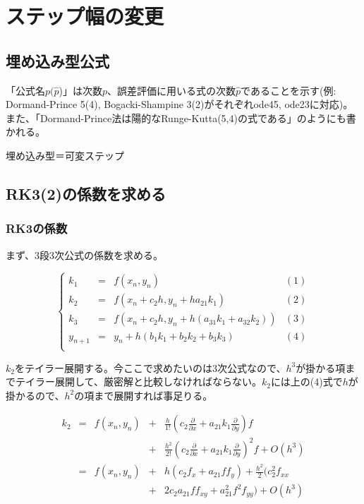 \section{ステップ幅の変更}
\subsection{埋め込み型公式}
「公式名\(p(\hat{p}\))」は次数\(p\)、誤差評価に用いる式の次数\(\hat{p}\)であることを示す(例: Dormand-Prince 5(4), Bogacki-Shampine 3(2)がそれぞれode45, ode23に対応)。
また、「Dormand-Prince法は陽的なRunge-Kutta(5,4)の式である」のようにも書かれる。

埋め込み型＝可変ステップ

\subsection{RK3(2)の係数を求める}
\subsubsection{RK3の係数}
まず、3段3次公式の係数を求める。

\[
\left\{
\begin{array}{lclc}
k_1 & = & f(x_n,y_n) & (1)\\
k_2 & = & f(x_n+c_2h,y_n+ha_{21}k_1) & (2)\\
k_3 & = & f(x_n+c_2h,y_n+h(a_{31}k_1+a_{32}k_2)) & (3)\\
y_{n+1} & = & y_n + h(b_1k_1 + b_2k_2 + b_3k_3) & (4)\\
\end{array}
\right.
\]

\(k_2\)をテイラー展開する。今ここで求めたいのは3次公式なので、\(h^3\)が掛かる項までテイラー展開して、厳密解と比較しなければならない。\(k_2\)には上の(4)式で\(h\)が掛かるので、\(h^2\)の項まで展開すれば事足りる。

\[
\begin{array}{lclcl}
k_2 & = & f(x_n,y_n) & + & \frac{h}{1!}\left(c_2\frac{\partial}{\partial x} + a_{21}k_1 \frac{\partial}{\partial y}\right)f \\
   &   &            & + &\frac{h^2}{2!}\left(c_2\frac{\partial}{\partial x}+a_{21}k_1\frac{\partial}{\partial y}\right)^2f+O(h^3)\\
    & = & f(x_n,y_n) & + & h(c_2 f_x + a_{21} f f_y)+\frac{h^2}{2}(c_2^2 f_{xx}\\
    &   &            & + & 2 c_2 a_{21} f f_{xy} + a_{21}^2 f^2 f_{yy})+O(h^3)\\
\end{array}
\]

